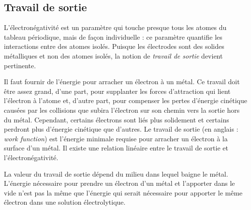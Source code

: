 \documentclass[12pt,oneside,letterpaper]{article}
\begin{document}
\subsection{Travail de sortie}

L'électronégativité est un paramètre qui touche presque tous les atomes du tableau périodique, mais de façon individuelle : ce paramètre quantifie les interactions entre des atomes isolés. Puisque les électrodes sont des solides métalliques et non des atomes isolés, la notion de \textit{travail de sortie} devient pertinente.

Il faut fournir de l'énergie pour arracher un électron à un métal. Ce travail doit être assez grand, d'une part, pour supplanter les forces d'attraction qui lient l'électron à l'atome et, d'autre part, pour compenser les pertes d'énergie cinétique causées par les collisions que subira l'électron sur son chemin vers la sortie hors du métal. Cependant, certains électrons sont liés plus solidement et certains perdront plus d'énergie cinétique que d'autres. Le travail de sortie (en anglais : \textit{work function}) est l'énergie minimale requise pour arracher un électron à la surface d'un métal. %
Il existe une relation linéaire entre le travail de sortie et l'électronégativité. %

La valeur du travail de sortie dépend du milieu dans lequel baigne le métal. L'énergie nécessaire pour prendre un électron d'un métal et l'apporter dans le vide n'est pas la même que l'énergie qui serait nécessaire pour apporter le même électron dans une solution électrolytique.
\end{document}
